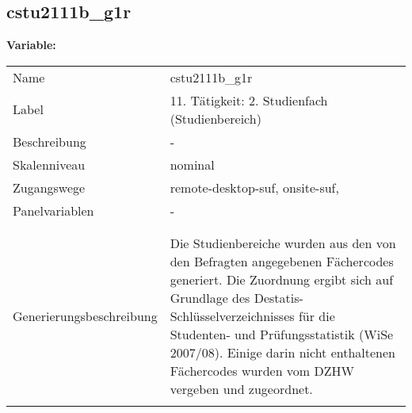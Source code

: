 	
	
	\subsection{cstu2111b\_g1r}
	\label{subSection:cstu2111b_g1r}

	\noindent\textbf{Variable:}\\
		\begin{tabular}{lL{11.3cm}}
			\label{tableVariable:cstu2111b_g1r}
			Name & cstu2111b\_g1r \\
			Label & 11. Tätigkeit: 2. Studienfach (Studienbereich) \\
			Beschreibung & - \\
			Skalenniveau & nominal \\
			Zugangswege &
				remote-desktop-suf,
				onsite-suf,
 \\
			Panelvariablen & -
			 \\
			 \\
 \\
					Generierungsbeschreibung & Die Studienbereiche wurden aus den von den Befragten angegebenen Fächercodes generiert. Die Zuordnung ergibt sich auf Grundlage des Destatis-Schlüsselverzeichnisses für die Studenten- und Prüfungsstatistik (WiSe 2007/08). Einige darin nicht enthaltenen Fächercodes wurden vom DZHW vergeben und zugeordnet. 
				 \\	
			 \\
		\end{tabular}






